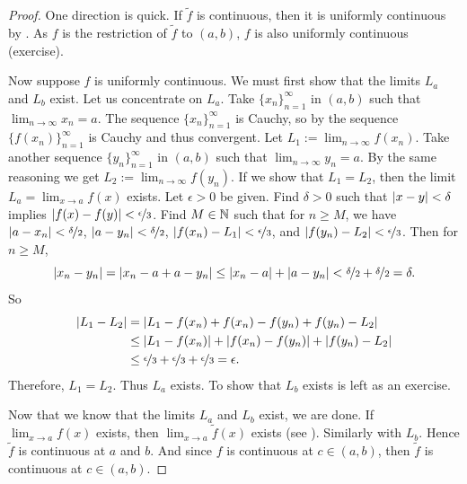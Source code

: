 \begin{proof}
One direction is quick.  If $\widetilde{f}$ is continuous, then
it is uniformly continuous by .  As $f$ is the
restriction of $\widetilde{f}$ to $(a,b)$, $f$ is also uniformly continuous
(exercise).

Now suppose $f$ is uniformly continuous.  We must first show
that the limits $L_a$ and $L_b$ exist.  Let us concentrate on $L_a$.
Take $\{ x_n \}_{n=1}^\infty$ in $(a,b)$ such that
$\lim_{n\to\infty} x_n = a$.
The sequence $\{ x_n \}_{n=1}^\infty$ is Cauchy, so by
the sequence $\bigl\{ f(x_n) \bigr\}_{n=1}^\infty$ is Cauchy and thus convergent.
Let $L_1 := \lim_{n\to\infty} f(x_n)$.  Take another sequence
$\{ y_n \}_{n=1}^\infty$ in $(a,b)$ such that $\lim_{n\to\infty} y_n = a$.  By the same reasoning
we get $L_2 := \lim_{n\to\infty} f(y_n)$.  If we show that $L_1 = L_2$, then
the limit $L_a = \lim_{x\to a} f(x)$ exists.  Let $\epsilon > 0$ be given.
Find $\delta > 0$ such that $\left\lvert {x-y} \right\rvert < \delta$ implies $\left\lvert {f(x)-f(y)} \right\rvert <
\nicefrac{\epsilon}{3}$.  Find $M \in {\mathbb{N}}$ such that for
$n \geq M$, we have $\left\lvert {a-x_n} \right\rvert < \nicefrac{\delta}{2}$,
$\left\lvert {a-y_n} \right\rvert < \nicefrac{\delta}{2}$,
$\left\lvert {f(x_n)-L_1} \right\rvert < \nicefrac{\epsilon}{3}$, and
$\left\lvert {f(y_n)-L_2} \right\rvert < \nicefrac{\epsilon}{3}$.  Then for $n \geq M$,
\begin{equation*}
\left\lvert {x_n-y_n} \right\rvert = 
\left\lvert {x_n-a+a-y_n} \right\rvert \leq
\left\lvert {x_n-a} \right\rvert+\left\lvert {a-y_n} \right\rvert < \nicefrac{\delta}{2} + \nicefrac{\delta}{2} =
\delta.
\end{equation*}
So
\begin{equation*}
\begin{split}
\left\lvert {L_1-L_2} \right\rvert &=
\left\lvert {L_1-f(x_n)+f(x_n)-f(y_n)+f(y_n)-L_2} \right\rvert \\
& \leq 
\left\lvert {L_1-f(x_n)} \right\rvert+\left\lvert {f(x_n)-f(y_n)} \right\rvert+\left\lvert {f(y_n)-L_2} \right\rvert \\
& \leq
\nicefrac{\epsilon}{3} + \nicefrac{\epsilon}{3} + \nicefrac{\epsilon}{3}
=
\epsilon .
\end{split}
\end{equation*}
Therefore, $L_1 = L_2$.
Thus $L_a$ exists.  To show that $L_b$ exists is left as an exercise.

Now that we know that the
limits $L_a$ and $L_b$ exist, we are done.  If $\lim_{x\to a} f(x)$
exists, then $\lim_{x\to a} \widetilde{f}(x)$ exists
(see ).  Similarly with $L_b$.
Hence $\widetilde{f}$ is continuous at $a$ and $b$.  
And since $f$ is continuous at $c \in (a,b)$, then
$\widetilde{f}$ is continuous at $c \in (a,b)$.
\end{proof}

